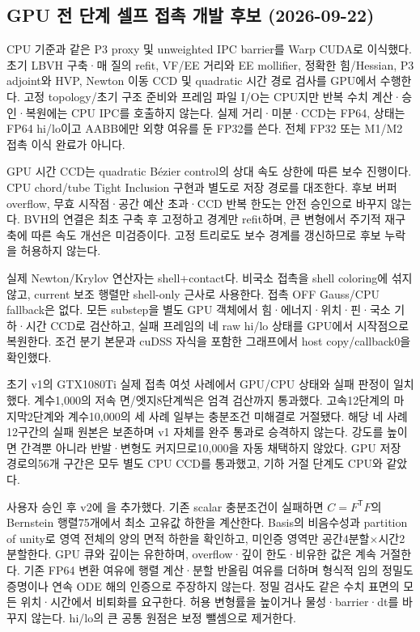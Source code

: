 \documentclass[10pt]{article}
\begin{document}
\subsection{GPU 전 단계 셀프 접촉 개발 후보 (2026-09-22)}
\label{sec:r1-gpu-self-contact}
CPU 기준과 같은 P3 proxy 및 unweighted IPC barrier를 Warp CUDA로 이식했다.
초기 LBVH 구축·매 질의 refit, VF/EE 거리와 EE mollifier, 정확한 힘/Hessian,
P3 adjoint와 HVP, Newton 이동 CCD 및 quadratic 시간 경로 검사를 GPU에서 수행한다.
고정 topology/초기 구조 준비와 프레임 파일 I/O는 CPU지만 반복 수치 계산·승인·복원에는
CPU IPC를 호출하지 않는다. 실제 거리·미분·CCD는 FP64, 상태는 FP64 hi/lo이고
AABB에만 외향 여유를 둔 FP32를 쓴다. 전체 FP32 또는 M1/M2 접촉 이식 완료가 아니다.

GPU 시간 CCD는 quadratic Bézier control의 상대 속도 상한에 따른 보수 진행이다.
CPU chord/tube Tight Inclusion 구현과 별도로 저장 경로를 대조한다. 후보 버퍼 overflow,
무효 시작점·공간 예산 초과·CCD 반복 한도는 안전 승인으로 바꾸지 않는다.
BVH의 연결은 최초 구축 후 고정하고 경계만 refit하며, 큰 변형에서 주기적 재구축에 따른
속도 개선은 미검증이다. 고정 트리로도 보수 경계를 갱신하므로 후보 누락을 허용하지 않는다.

실제 Newton/Krylov 연산자는 shell+contact다. 비국소 접촉을 shell coloring에 섞지 않고,
current 보조 행렬만 shell-only 근사로 사용한다. 접촉 OFF Gauss/CPU fallback은 없다.
모든 substep을 별도 GPU 객체에서 힘·에너지·위치·핀·국소 기하·시간 CCD로 검산하고,
실패 프레임의 네 raw hi/lo 상태를 GPU에서 시작점으로 복원한다. 조건 분기 본문과
cuDSS 자식을 포함한 그래프에서 host copy/callback0을 확인했다.

초기 v1의 GTX1080Ti 실제 접촉 여섯 사례에서 GPU/CPU 상태와 실패 판정이 일치했다.
계수1,000의 저속 면/엣지8단계씩은 엄격 검산까지 통과했다. 고속12단계의 마지막2단계와
계수10,000의 세 사례 일부는  충분조건 미해결로 거절됐다.
해당 네 사례12구간의 실패 원본은 보존하며 v1 자체를 완주 통과로 승격하지 않는다.
강도를 높이면 간격뿐 아니라 반발·변형도 커지므로10,000을 자동 채택하지 않았다.
GPU 저장 경로의56개 구간은 모두 별도 CPU CCD를 통과했고, 기하 거절 단계도 CPU와 같았다.

사용자 승인 후 v2에 을 추가했다. 기존 scalar 충분조건이
실패하면 \(C=F^{\mathsf T}F\)의 Bernstein 행렬75개에서 최소 고유값 하한을 계산한다.
Basis의 비음수성과 partition of unity로 영역 전체의 양의 면적 하한을 확인하고,
미인증 영역만 공간4분할\(\times\)시간2분할한다. GPU 큐와 깊이는 유한하며,
overflow·깊이 한도·비유한 값은 계속 거절한다. 기존 FP64 변환 여유에 행렬 계산·분할
반올림 여유를 더하며 형식적 임의 정밀도 증명이나 연속 ODE 해의 인증으로 주장하지 않는다.
정밀 검사도 같은 수치 표면의 모든 위치·시간에서 비퇴화를 요구한다. 허용 변형률을
높이거나 물성·barrier·dt를 바꾸지 않는다. hi/lo의 큰 공통 원점은 보정 뺄셈으로 제거한다.
\end{document}
